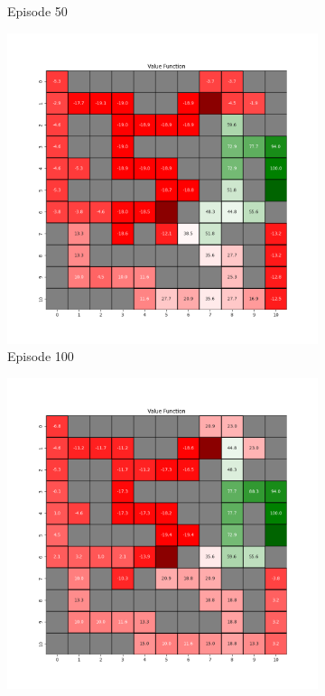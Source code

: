 \documentclass{assignment}
\begin{document}
\begin{figure}[H]
\begin{subfigure}{0.3\textwidth}
    \caption{Episode 50}
    \end{subfigure}\hfill
    \begin{subfigure}{0.3\textwidth}
        \includegraphics[width=\textwidth]{figures/value_q/alpha_sweep/value_function_alpha_1_gamma_0.95_epsilon_0.2_iteration_100.png}
    \caption{Episode 100}
    \end{subfigure}
    \begin{subfigure}{0.3\textwidth}
        \includegraphics[width=\textwidth]{figures/value_q/alpha_sweep/value_function_alpha_1_gamma_0.95_epsilon_0.2_iteration_1000.png}

\end{subfigure}
\end{figure}
\end{document}

